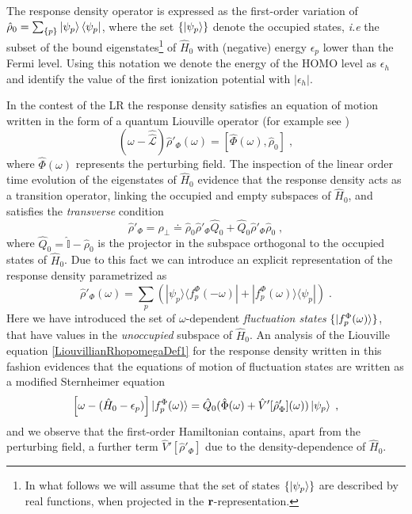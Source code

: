 \documentclass[reprint,aps,prb]{revtex4-1}
\renewcommand{\r}{{\bf r}}
\newcommand{\eps}{\epsilon}
\newcommand{\be}{\begin{equation}}
\newcommand{\ee}{\end{equation}}
\newcommand{\lb}{\label}
\newcommand{\op}[1]{\hat {#1}}
\newcommand{\sop}[1]{\op{\op {#1}}}
\newcommand{\commutator}[2]{\left[ {#1} , {#2} \right]}
\newcommand{\ketbra}[2]{| #1 \rangle \langle #2 |}
\newcommand{\dmnot}{\op{\rho}_0}
\newcommand{\dm}{\op{\rho}}
\newcommand{\hnot}{\op{H}_0}
\newcommand{\Liouv}{\sop{\mathcal L}}
\newcommand{\identity}{\op{\mathbb I}}
\begin{document}
\label{FluctuationState}

The response density operator is expressed as the first-order variation of $\dmnot=\sum_{\{p\}} \ket{\psi_p} \bra{\psi_p}$, where the set $\{\ket{\psi_p}\}$ denote the 
occupied states, \emph{i.e} the subset of the bound eigenstates\footnote{In what follows we will assume that the set of states $\{\ket{\psi_p}\}$ are described by real 
functions, when projected in the $\r$-representation.} of $\hnot$ with (negative) energy $\eps_p$ lower than the Fermi level. Using this notation we denote the energy of the HOMO level 
as $\eps_h$ and identify the value of the first ionization potential with $|\eps_h|$. 

In the contest of the LR the response density satisfies an equation of motion written in the form of a quantum Liouville operator (for example see \cite{baroni2008})
\be\lb{LiouvillianRhopomegaDef1}
\left(\omega - \Liouv\right) \dm'_\Phi(\omega) =  \commutator{\op\Phi(\omega)}{\dmnot} \;,
\ee
where $\op\Phi(\omega)$ represents the perturbing field. 
The inspection of the linear order time evolution of the eigenstates of $\hnot$ evidence that the response density acts as a transition 
operator, linking the occupied and empty subspaces of $\hnot$, and satisfies the \emph{transverse} condition  
\be\lb{RhopTransverseDef1}
\dm'_\Phi = \dm_{\perp} \doteq \dmnot\dm'_\Phi\op Q_0 + \op Q_0\dm'_\Phi\dmnot \;,
\ee
where $\op Q_0=\identity-\dmnot$ is the projector in the subspace orthogonal to the occupied states of $\hnot$. 
Due to this fact we can introduce an explicit representation of the 
response density parametrized as
\be\lb{rhoPrimeFluctuationStateDef1}
\dm'_\Phi(\omega) = \sum_p\left(\ketbra{\psi_p}{f_p^\Phi(-\omega)} + \ketbra{f_p^\Phi(\omega)}{\psi_p}\right) \;.
\ee
Here we have introduced the set of $\omega$-dependent \emph{fluctuation states} $\{\ket{f_p^\Phi(\omega)}\}$, 
that have values in the \emph{unoccupied} subspace of $\hnot$. 
An analysis of the Liouville equation \eqref{LiouvillianRhopomegaDef1} for the response density written in this fashion evidences that the equations of motion of fluctuation states are 
written as a modified Sternheimer equation~\cite{mahan1980,giustino2012,giustino2014}
\be\lb{fluctuationStateEqMotion1}
\left[\omega - (\hnot-\eps_p)\right]\ket{f_p^\Phi(\omega)} = \op Q_0(\op\Phi(\omega)+\op V'[\dm'_\Phi](\omega))\ket{\psi_p} \;,
\ee
and we observe that the first-order Hamiltonian contains, 
apart from the perturbing field, a further term $\op V'[\dm'_\Phi]$ due to the density-dependence of $\hnot$.
\end{document}

